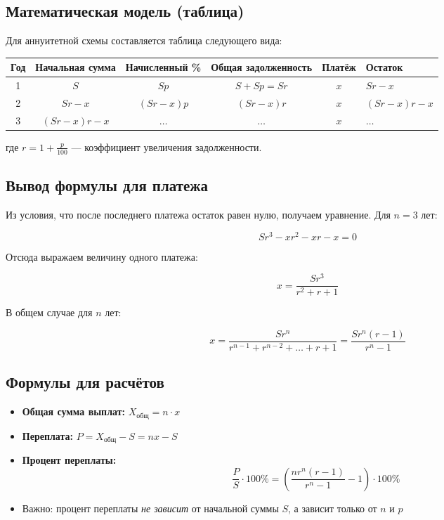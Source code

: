 \documentclass[a4paper,12pt]{article}
\begin{document}
\subsection*{Математическая модель (таблица)}
Для аннуитетной схемы составляется таблица следующего вида:

\begin{center}
\renewcommand{\arraystretch}{1.4}
\begin{tabular}{ccccc}
\toprule
Год & Начальная сумма & Начисленный \% & Общая задолженность & Платёж & Остаток \\
 & $S$ & $Sp$ & $S + Sp = Sr$ & $x$ & $Sr - x$ \\
2 & $Sr - x$ & $(Sr-x)p$ & $(Sr-x)r$ & $x$ & $(Sr-x)r - x$ \\
3 & $(Sr-x)r - x$ & $\ldots$ & $\ldots$ & $x$ & $\ldots$ \\
\bottomrule
\end{tabular}
\end{center}

где $r = 1 + \frac{p}{100}$ — коэффициент увеличения задолженности.

\subsection*{Вывод формулы для платежа}
Из условия, что после последнего платежа остаток равен нулю, получаем уравнение. Для $n=3$ лет:

$$Sr^3 - xr^2 - xr - x = 0$$

Отсюда выражаем величину одного платежа:

$$x = \frac{Sr^3}{r^2 + r + 1}$$

В общем случае для $n$ лет:

$$x = \frac{Sr^n}{r^{n-1} + r^{n-2} + \ldots + r + 1} = \frac{Sr^n(r-1)}{r^n - 1}$$

\subsection*{Формулы для расчётов}
\begin{itemize}[label=\textcolor{accent}{\textbullet}, leftmargin=*]
    \item \textbf{Общая сумма выплат:} $X_{общ} = n \cdot x$
    \item \textbf{Переплата:} $P = X_{общ} - S = nx - S$
    \item \textbf{Процент переплаты:} 
    $$\frac{P}{S} \cdot 100\% = \left(\frac{nr^n(r-1)}{r^n-1} - 1\right) \cdot 100\%$$
    \item Важно: процент переплаты \textit{не зависит} от начальной суммы $S$, а зависит только от $n$ и $p$
\end{itemize}
\end{document}
